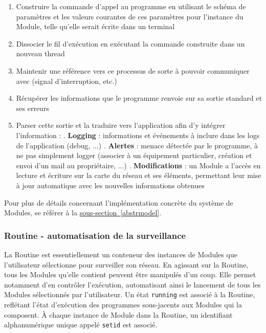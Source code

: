 \documentclass[]{article}
\newcommand{\wordlink}[2]{\hyperref[#1]{#2~\ref{#1}}}
\begin{document}
\begin{enumerate}
\item Construire la commande d'appel au programme en utilisant le schéma de paramètres et les valeurs courantes de ces paramètres pour l'instance du Module, telle qu'elle serait écrite dans un terminal
\item Dissocier le fil d'exécution en exécutant la commande construite dans un nouveau thread
\item Maintenir une référence vers ce processus de sorte à pouvoir communiquer avec (signal d'interruption, etc.)
\item Récupérer les informations que le programme renvoie sur sa sortie standard et ses erreurs
\item Parser cette sortie et la traduire vers l'application afin d'y intégrer l'information :
. \textbf{Logging} : informations et événements à inclure dans les logs de l'application (debug, ...)
. \textbf{Alertes} : menace détectée par le programme, à ne pas simplement logger (associer à un équipement particulier, création et envoi d'un mail au propriétaire, ...)
. \textbf{Modifications} : un Module a l'accès en lecture et écriture sur la carte du réseau et ses éléments, permettant leur mise à jour automatique avec les nouvelles informations obtenues
\end{enumerate}

\vspace{0.4cm}

Pour plus de détails concernant l'implémentation concrète du système de Modules, se référer à la \wordlink{abstrmodel}{sous-section}.

\subsubsection{Routine - automatisation de la surveillance}

\par La Routine est essentiellement un conteneur des instances de Modules que l'utilisateur sélectionne pour surveiller son réseau. En agissant sur la Routine, tous les Modules qu'elle contient peuvent être manipulés d'un coup. Elle permet notamment d'en contrôler l'exécution, automatisant ainsi le lancement de tous les Modules sélectionnés par l'utilisateur. Un état \texttt{running} est associé à la Routine, reflétant l'état d'exécution des programmes sous-jacents aux Modules qui la composent. À chaque instance de Module dans la Routine, un identifiant alphanumérique unique appelé \texttt{setid} est associé.\\
\end{document}
